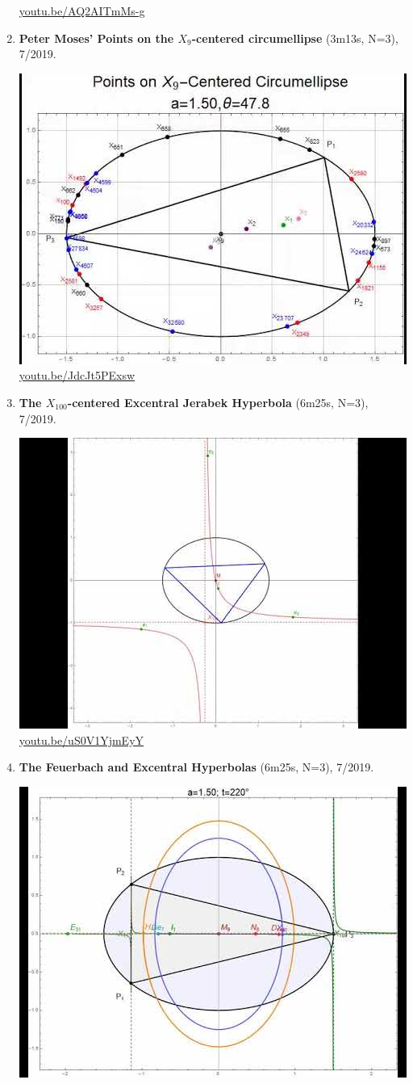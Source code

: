 \documentclass[12pt]{amsart}
\begin{document}
\begin{enumerate}[resume]
\begin{center}
\href{https://youtu.be/AQ2AITmMs-g}{\url{youtu.be/AQ2AITmMs-g}}\end{center}
% 
\item \textbf{Peter Moses' Points on the $X_{9}$-centered circumellipse} (3m13s, N=3), 7/2019. 
\begin{center}\includegraphics[width=.5\textwidth]{pics/JdcJt5PExsw.jpg} \\ 
\href{https://youtu.be/JdcJt5PExsw}{\url{youtu.be/JdcJt5PExsw}}\end{center}
% 
\item \textbf{The $X_{100}$-centered Excentral Jerabek Hyperbola} (6m25s, N=3), 7/2019. 
\begin{center}\includegraphics[width=.5\textwidth]{pics/uS0V1YjmEyY.jpg} \\ 
\href{https://youtu.be/uS0V1YjmEyY}{\url{youtu.be/uS0V1YjmEyY}}\end{center}
% 
\item \textbf{The Feuerbach and Excentral Hyperbolas} (6m25s, N=3), 7/2019. 
\begin{center}\includegraphics[width=.5\textwidth]{pics/T5vXNsRcHZg.jpg} \\ 

\end{center}
\end{enumerate}
\end{document}
